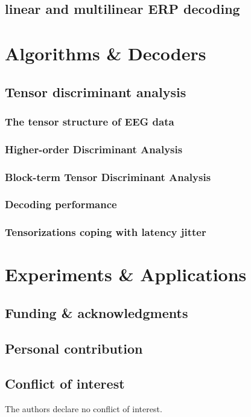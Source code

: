 \chapter{linear and multilinear ERP decoding}

\part{Algorithms \& Decoders}

\chapter{Tensor discriminant analysis}
\section{The tensor structure of EEG data}
\section{Higher-order Discriminant Analysis}
\section{Block-term Tensor Discriminant Analysis}
\section{Decoding performance}
\section{Tensorizations coping with latency jitter}

\part{Experiments \& Applications}

\backmatter%
\pagestyle{front}
\chapter{Funding \& acknowledgments}
\lipsum[1]
\chapter{Personal contribution}
\lipsum[2]
\chapter{Conflict of interest}
The authors declare no conflict of interest.


